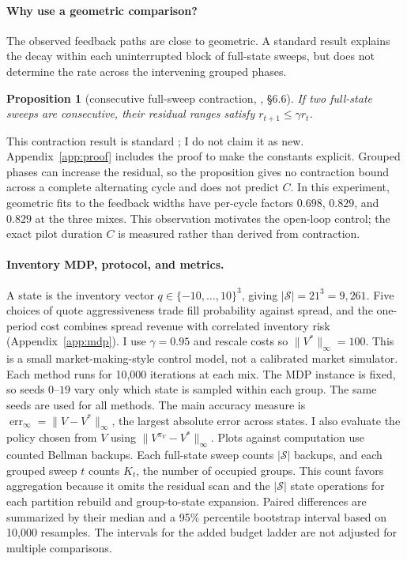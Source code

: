 \documentclass{article}
\newtheorem{proposition}{Proposition}
\newcommand{\err}{\operatorname{err}_{\infty}}
\begin{document}
\paragraph{Why use a geometric comparison?}
The observed feedback paths are close to geometric.  A standard result explains
the decay within each uninterrupted block of full-state sweeps, but does not
determine the rate across the intervening grouped phases.

\begin{proposition}[consecutive full-sweep contraction, \citealp{puterman1994}, §6.6]
\label{prop:bound}
If two full-state sweeps are consecutive, their residual ranges satisfy
$r_{t+1}\le\gamma r_t$.
\end{proposition}

This contraction result is standard \citep[][§6.6]{puterman1994}; I do not
claim it as new.  Appendix~\ref{app:proof} includes the proof to make the
constants explicit.  Grouped phases can increase the residual, so the
proposition gives no contraction bound across a complete alternating cycle and
does not predict $C$.  In this experiment, geometric fits to the feedback widths have
per-cycle factors $0.698$, $0.829$, and $0.829$ at the three mixes.  This
observation motivates the open-loop control; the exact pilot duration $C$ is
measured rather than derived from contraction.

\paragraph{Inventory MDP, protocol, and metrics.}
A state is the inventory vector $q\in\{-10,\ldots,10\}^3$, giving
$|\mathcal S|=21^3=9{,}261$.  Five choices of quote aggressiveness trade fill
probability against spread, and the one-period cost combines spread revenue with
correlated inventory risk (Appendix~\ref{app:mdp}).  I use $\gamma=0.95$ and
rescale costs so $\lVert V^*\rVert_\infty=100$.  This is a small
market-making-style control model, not a calibrated market simulator.  Each
method runs for 10,000 iterations at each mix.  The MDP instance is fixed, so
seeds $0$--$19$ vary only which state is sampled within each group.  The same
seeds are used for all methods.  The main accuracy measure is
$\err=\lVert V-V^*\rVert_\infty$, the largest absolute error across states.  I
also evaluate the policy chosen from $V$ using
$\lVert V^{\pi_V}-V^*\rVert_\infty$.
Plots against computation use counted Bellman backups.  Each full-state sweep
counts $|\mathcal S|$ backups, and each grouped sweep $t$ counts $K_t$, the number of
occupied groups.  This count favors aggregation because it omits the residual
scan and the $|\mathcal S|$ state operations for each partition rebuild and
group-to-state expansion.
Paired differences are summarized by their median and a 95\% percentile
bootstrap interval based on 10,000 resamples.  The intervals for the added
budget ladder are not adjusted for multiple comparisons.
\end{document}
